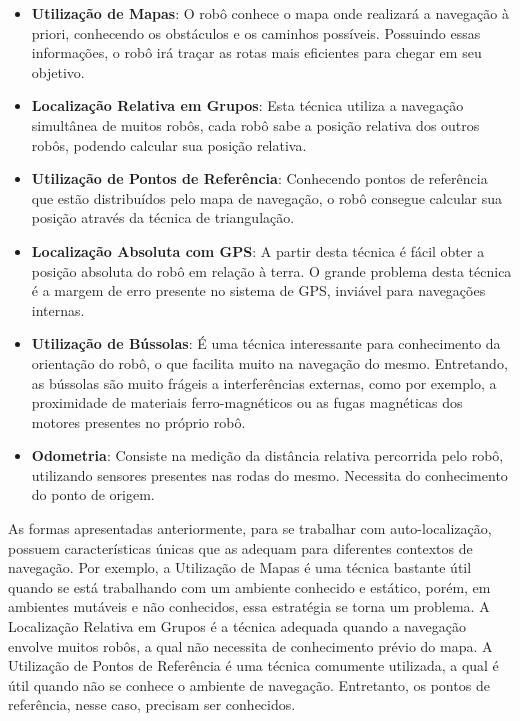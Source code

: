 	\begin{itemize}
		\item \textbf{Utilização de Mapas}: O robô conhece o mapa onde realizará a navegação à priori, conhecendo os obstáculos e os caminhos possíveis. Possuindo essas informações, o robô irá traçar as rotas mais eficientes para chegar em seu objetivo.

		\item \textbf{Localização Relativa em Grupos}: Esta técnica utiliza a navegação simultânea de muitos robôs, cada robô sabe a posição relativa dos outros robôs, podendo calcular sua posição relativa.

		\item \textbf{Utilização de Pontos de Referência}: Conhecendo pontos de referência que estão distribuídos pelo mapa de navegação, o robô consegue calcular sua posição através da técnica de triangulação.

		\item \textbf{Localização Absoluta com GPS}: A partir desta técnica é fácil obter a posição absoluta do robô em relação à terra. O grande problema desta técnica é a margem de erro presente no sistema de GPS, inviável para navegações internas.

		\item \textbf{Utilização de Bússolas}: É uma técnica interessante para conhecimento da orientação do robô, o que facilita muito na navegação do mesmo. Entretando, as bússolas são muito frágeis a interferências externas, como por exemplo, a proximidade de materiais ferro-magnéticos ou as fugas magnéticas dos motores presentes no próprio robô.

		\item \textbf{Odometria}: Consiste na medição da distância relativa percorrida pelo robô, utilizando sensores presentes nas rodas do mesmo. Necessita do conhecimento do ponto de origem.
		 
	\end{itemize}

	As formas apresentadas anteriormente, para se trabalhar com auto-localização, possuem características únicas que as adequam para diferentes contextos de navegação. Por exemplo, a Utilização de Mapas é uma técnica bastante útil quando se está trabalhando com um ambiente conhecido e estático, porém, em ambientes mutáveis e não conhecidos, essa estratégia se torna um problema. A Localização Relativa em Grupos é a técnica adequada quando a navegação envolve muitos robôs, a qual não necessita de conhecimento prévio do mapa. A Utilização de Pontos de Referência é uma técnica comumente utilizada, a qual é útil quando não se conhece o ambiente de navegação. Entretanto, os pontos de referência, nesse caso, precisam ser conhecidos. 

